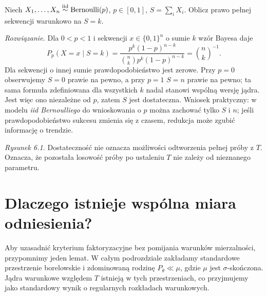 \begin{zadanie}\label{zad:suff-bernoulli}
Niech $X_1,\ldots,X_n\mathrel{\overset{\mathrm{iid}}\sim}\operatorname{Bernoulli}(p)$,
$p\in[0,1]$, $S=\sum_iX_i$. Oblicz prawo pełnej sekwencji
warunkowo na $S=k$.
\par\emph{Rozwiązanie.} Dla $0<p<1$ i sekwencji
$x\in\{0,1\}^n$ o sumie $k$ wzór Bayesa daje
\[
P_p(X=x\mid S=k)=\frac{p^k(1-p)^{n-k}}
 {\binom nk p^k(1-p)^{n-k}}=\binom nk^{-1}.
\]
Dla sekwencji o innej sumie prawdopodobieństwo jest zerowe.
Przy $p=0$ obserwujemy $S=0$ prawie na pewno, a przy $p=1$
$S=n$ prawie na pewno; ta sama formuła zdefiniowana dla wszystkich
$k$ nadal stanowi wspólną wersję jądra. Jest więc ono niezależne
od $p$, zatem $S$ jest dostateczna. Wniosek praktyczny:
w modelu \emph{iid Bernoulliego} do wnioskowania o $p$ można
zachować tylko $S$ i $n$; jeśli prawdopodobieństwo sukcesu zmienia
się z czasem, redukcja może zgubić informację o trendzie.
\end{zadanie}


\begin{center}
\end{center}
\noindent\emph{Rysunek 6.1.} Dostateczność nie oznacza możliwości
odtworzenia pełnej próby z $T$. Oznacza, że pozostała losowość
próby po ustaleniu $T$ nie zależy od nieznanego parametru.

\section{Dlaczego istnieje wspólna miara odniesienia?}
Aby uzasadnić kryterium faktoryzacyjne bez pomijania warunków
mierzalności, przypomnimy jeden lemat. W całym podrozdziale
zakładamy standardowe przestrzenie borelowskie i zdominowaną
rodzinę $P_\theta\ll\mu$, gdzie $\mu$ jest $\sigma$-skończona.
Jądra warunkowe względem $T$ istnieją w tych przestrzeniach,
co przyjmujemy jako standardowy wynik o regularnych rozkładach
warunkowych.

